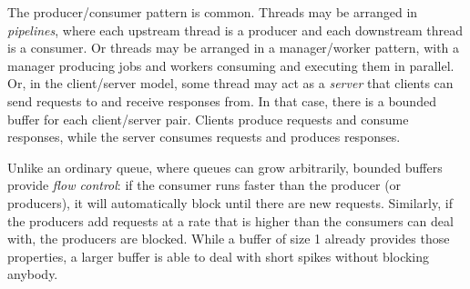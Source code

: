 \documentclass{report}
\newcommand{\harmonylink}[1]{%
[\href{https://harmony.cs.cornell.edu/#1}{\underline{#1}}]%
}
\newenvironment{code}{
\tcolorbox
}{
\endtcolorbox
}
\begin{document}
{The producer/consumer pattern is common.  Threads may be arranged
in \emph{pipelines},
%
where each upstream thread is a producer and each downstream
thread is a consumer.
Or threads may be arranged in a manager/worker pattern, with a manager
producing jobs and workers consuming and executing them in parallel.
Or, in the client/server model,
%
some thread may act as a \emph{server} that clients can send requests to
and receive responses from.  In that case, there is a bounded buffer
for each client/server pair. Clients produce requests and
consume responses, while the server consumes requests and produces responses.

%
Unlike an ordinary queue, where queues can grow arbitrarily, bounded buffers
provide \emph{flow control}: if the consumer runs faster than the producer
(or producers), it will automatically block until there are new requests.
Similarly, if the producers add requests at a rate that is higher than the
consumers can deal with, the producers are blocked.  While a buffer of size 1
already provides those properties, a larger buffer is able to deal with short
spikes without blocking anybody.

}
\end{document}
